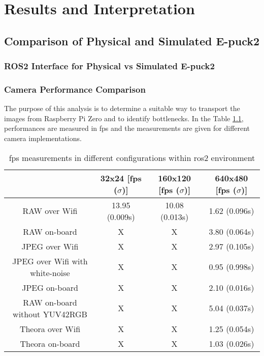 \chapter{Results and Interpretation}
\label{chap:results}

\section{Comparison of Physical and Simulated E-puck2}

\subsection{ROS2 Interface for Physical vs Simulated E-puck2}
\subsection{Camera Performance Comparison}
The purpose of this analysis is to determine a suitable way to transport the images from Raspberry Pi Zero and to identify bottlenecks. In the Table \ref{tab:results:camera_perf}, performances are measured in \ac{fps} and the measurements are given for different camera implementations.

\begin{table}[H]
    \begin{adjustwidth}{-1.5in}{-1.5in} 
    \centering
    \begin{tabular}{|c|c|c|c|}
        \hline
         & 32x24 [\ac{fps} ($ \sigma $)] & 160x120 [\ac{fps} ($ \sigma $)] & 640x480 [\ac{fps} ($ \sigma $)] \\
         \hline
         RAW over Wifi & 13.95 (0.009s) & 10.08 (0.013s) & 1.62 (0.096s) \\
         \hline
         RAW on-board & X & X & 3.80 (0.064s) \\
        \hline
        JPEG over Wifi & X & X & 2.97 (0.105s) \\
        \hline
        JPEG over Wifi with white-noise & X & X & 0.95 (0.998s) \\
        \hline
        JPEG on-board & X & X & 2.10 (0.016s) \\
        \hline
        RAW on-board without YUV42RGB & X & X & 5.04 (0.037s) \\
        \hline
        Theora over Wifi & X & X & 1.25 (0.054s) \\
        \hline
        Theora on-board & X & X & 1.03 (0.026s) \\
        \hline
    \end{tabular}
    \end{adjustwidth}
    
    \caption{\ac{fps} measurements in different configurations within \ac{ros2} environment}
    \label{tab:results:camera_perf}
\end{table}

